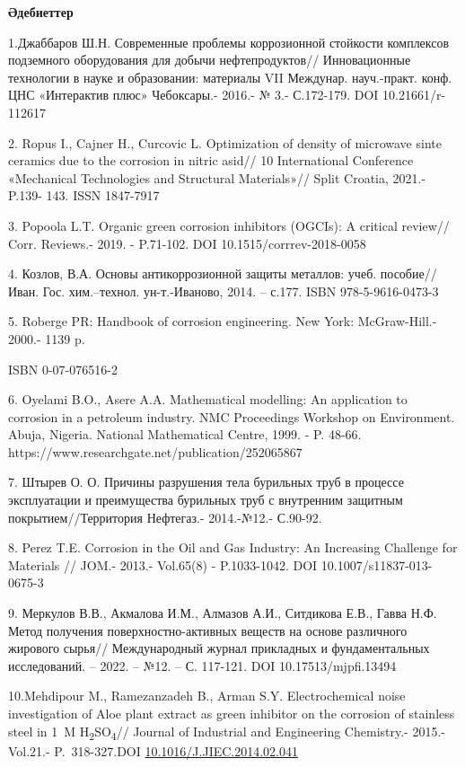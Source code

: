 \begin{center}
	{\bfseries Әдебиеттер}
	\end{center}
	
	\begin{references}

1.Джаббаров Ш.Н. Современные проблемы коррозионной стойкости комплексов
подземного оборудования для добычи нефтепродуктов// Инновационные
технологии в науке и образовании: материалы VII Междунар. науч.-практ.
конф. ЦНС «Интерактив плюс» Чебоксары.- 2016.- № 3.- С.172-179. DOI
10.21661/r-112617

2. Ropus I., Cajner H., Curcovic L. Optimization of density of microwave
sinte ceramics due to the corrosion in nitric asid// 10 International
Conference «Mechanical Technologies and Structural Materials»// Split
Croatia, 2021.- P.139- 143. ISSN 1847-7917

3. Popoola L.T. Organic green corrosion inhibitors (OGCIs): A critical
review// Corr. Reviews.- 2019. - P.71-102. DOI 10.1515/corrrev-2018-0058

4. Козлов, В.А. Основы антикоррозионной защиты металлов: учеб.
пособие//Иван. Гос. хим.--технол. ун-т.-Иваново, 2014. -- с.177. ISBN
978-5-9616-0473-3

5. Roberge PR: Handbook of corrosion engineering. New York:
McGraw-Hill.- 2000.- 1139 p.

ISBN 0-07-076516-2

6. Oyelami B.O., Asere A.A. Mathematical modelling: An application to
corrosion in a petroleum industry. NMC Proceedings Workshop on
Environment. Abuja, Nigeria. National Mathematical Centre, 1999. - P.
48-66. https://www.researchgate.net/publication/252065867

7. Штырев О. О. Причины разрушения тела бурильных труб в процессе
эксплуатации и преимущества бурильных труб с внутренним защитным
покрытием//Территория Нефтегаз.- 2014.-№12.- С.90-92.

8. Perez T.E. Corrosion in the Oil and Gas Industry: An Increasing
Challenge for Materials // JOM.- 2013.- Vol.65(8) - P.1033-1042. DOI
10.1007/s11837-013-0675-3

9. Меркулов В.В., Акмалова И.М., Алмазов А.И., Ситдикова Е.В., Гавва
Н.Ф. Метод получения поверхностно-активных веществ на основе различного
жирового сырья// Международный журнал прикладных и фундаментальных
исследований. -- 2022. -- №12. -- С. 117-121. DOI 10.17513/mjpfi.13494

10.Mehdipour M., Ramezanzadeh B., Arman S.Y. Electrochemical noise
investigation of Aloe plant extract as green inhibitor on the corrosion
of stainless steel in 1~M H\textsubscript{2}SO\textsubscript{4}//
Journal of Industrial and Engineering Chemistry.- 2015.-Vol.21.-
P.~318-327.DOI \href{https://doi.org/10.1016/J.JIEC.2014.02.041}{10.1016/J.JIEC.2014.02.041}

\end{references}


